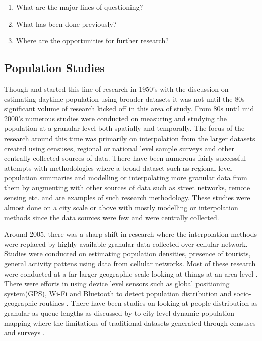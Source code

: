 \begin{enumerate}
  \setlength{\itemindent}{2em}
  \itemsep-0.25em
  \item What are the major lines of questioning?
  \item What has been done previously?
  \item Where are the opportunities for further research?
\end{enumerate}


\subsection{Population Studies}
Though \citet{foley1954} and \citet{schmitt1956} started this line of research in 1950's with the discussion on estimating daytime population using broader datasets it was not until the 80s significant volume of research kicked off in this area of study.
From 80s until mid 2000's numerous studies were conducted on measuring and studying the population at a granular level both spatially and temporally.
The focus of the research around this time was primarily on interpolation from the larger datasets created using censuses, regional or national level sample surveys and other centrally collected sources of data.
There have been numerous fairly successful attempts with methodologies where a broad dataset such  as regional level population summaries and modelling or interpolating more granular data from them by augmenting with other sources of data such as street networks\cite[-10cm]{reibel2005}, remote sensing\cite[-5.5cm]{sutton1997, yuan1997, chen2002} etc.
\citet{dobson2000, dobson2003a, bhaduri2002, bhaduri2007} and \citep{mennis2003, mennis2006} are examples of such research methodology.
These studies were almost done on a city scale or above with mostly modelling or interpolation methods since the data sources were few and were centrally collected.

Around 2005, there was a sharp shift in research where the interpolation methods were replaced by highly available granular data collected over cellular network.
Studies were conducted on estimating population densities, presence of tourists, general activity pattens using data from cellular networks.
Most of these research were conducted at a far larger geographic scale looking at things at an area level \citep{pulselli2008,girardin2009,phithakkitnukoon2010,yuan2016}.
There were efforts in using device level sensors such as global positioning system(GPS), Wi-Fi and Bluetooth to detect population distribution and socio-geographic routines \citep{calabrese2010,rose2010,farrahi2010}.
There have been studies on looking at people distribution as granular as queue lengths as discussed by \citet{wang2013} to city level dynamic population mapping where the limitations of traditional datasets generated through censuses and surveys \cite[-4cm]{deville2014}.

